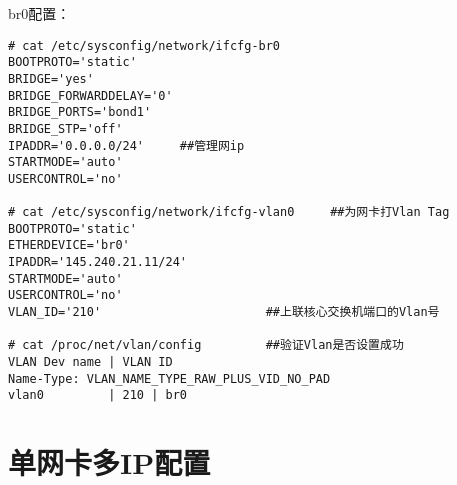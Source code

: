 br0配置：

\begin{verbatim}
# cat /etc/sysconfig/network/ifcfg-br0
BOOTPROTO='static'
BRIDGE='yes'
BRIDGE_FORWARDDELAY='0'
BRIDGE_PORTS='bond1'
BRIDGE_STP='off'
IPADDR='0.0.0.0/24'    	##管理网ip
STARTMODE='auto'
USERCONTROL='no'

# cat /etc/sysconfig/network/ifcfg-vlan0     ##为网卡打Vlan Tag
BOOTPROTO='static'
ETHERDEVICE='br0'
IPADDR='145.240.21.11/24'
STARTMODE='auto'
USERCONTROL='no'
VLAN_ID='210'                       ##上联核心交换机端口的Vlan号

# cat /proc/net/vlan/config         ##验证Vlan是否设置成功
VLAN Dev name | VLAN ID
Name-Type: VLAN_NAME_TYPE_RAW_PLUS_VID_NO_PAD
vlan0         | 210 | br0
\end{verbatim}

\section{单网卡多IP配置}
\label{sec:SingleCardMultiIP}


 
 
 



